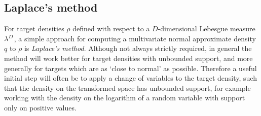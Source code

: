 \subsection{Laplace's method}

For target densities $\rho$ defined with respect to a $D$-dimensional Lebesgue measure $\lebm{D}$, a simple approach for computing a multivariate normal approximate density $q$ to $\rho$ is \emph{Laplace's method}. Although not always strictly required, in general the method will work better for target densities with unbounded support, and more generally for targets which are as `close to normal' as possible. Therefore a useful initial step will often be to apply a change of variables to the target density, such that the density on the transformed space has unbounded support, for example working with the density on the logarithm of a random variable with support only on positive values.

